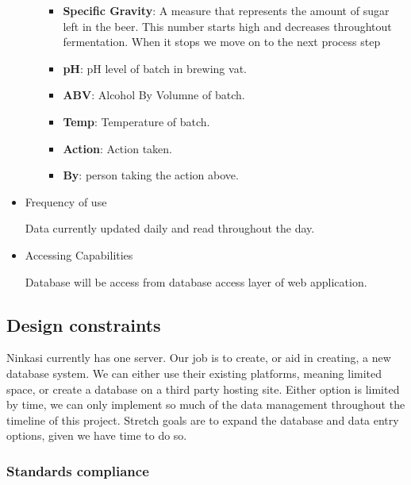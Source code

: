 \documentclass[draftclsnofoot,onecolumn,letterpaper,10pt,compsoc]{IEEEtran}
\begin{document}
\begin{itemize}
\begin{itemize}
{                }
                \begin{itemize}
                    \item{\textbf{Specific Gravity}: 
                        A measure that represents the amount of sugar left in the beer. 
                        This number starts high and decreases throughtout fermentation. 
                        When it stops we move on to the next process step
                    }
                    \item{\textbf{pH}: 
                        pH level of batch in brewing vat.
                    }
                    \item{\textbf{ABV}: Alcohol By Volumne of batch.}
                    \item{\textbf{Temp}: Temperature of batch.}
                    \item{\textbf{Action}: Action taken.}
                    \item{\textbf{By}:
                        person taking the action above.
                    }
                \end{itemize}
            \end{itemize}
        \item{Frequency of use}

            Data currently updated daily and read throughout the day.

        \item{Accessing Capabilities}

            Database will be access from database access layer of web application.
    \end{itemize}

	\subsection{Design constraints}
		Ninkasi currently has one server.
		Our job is to create, or aid in creating, a new database system.
		We can either use their existing platforms, meaning limited space, or create a database on a third party hosting site.
		Either option is limited by time, we can only implement so much of the data management throughout the timeline of this project.
		Stretch goals are to expand the database and data entry options, given we have time to do so.

		\subsubsection{Standards compliance}
\end{document}
